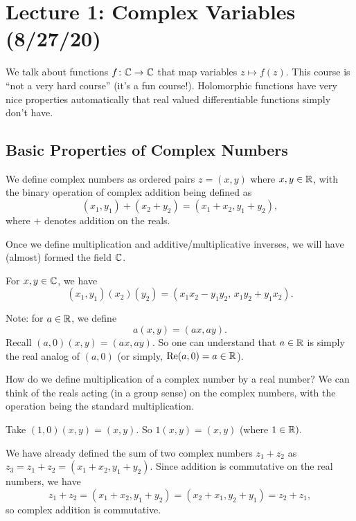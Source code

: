 \section{Lecture 1: Complex Variables (8/27/20)}
We talk about functions $ f \colon \mathbb{C} \to \mathbb{C}$ that map variables $z \mapsto f(z)$. This course is ``not a very hard course'' (it's a fun course!). Holomorphic functions have very nice properties automatically that real valued differentiable functions simply don't have.
\subsection{Basic Properties of Complex Numbers}
\begin{definition}
    We define complex numbers as ordered pairs $z=(x,y)$ where $x,y \in \mathbb{R}$, with the binary operation of complex addition being defined as \[
        (x_1,y_1)+(x_2+y_2)=(x_1+x_2,y_1+y_2),
    \]
   where $+$ denotes addition on the reals. 
\end{definition}
Once we define multiplication and additive/multiplicative inverses, we will have (almost) formed the field $\mathbb{C}$. 
\begin{definition}
    For $x,y \in \mathbb{C}$, we have 
    \[
    (x_1,y_1)(x_2)(y_2)=(x_1x_2-y_1y_2,\,x_1y_2+y_1x_2).
    \]
\end{definition}
Note: for $a \in \mathbb{R}$, we define \[
    a(x,y)=(ax,ay).
\]
Recall $(a,0)(x,y)=(ax,ay).$ So one can understand that $a\in\mathbb{R}$ is simply the real analog of $(a,0)$ (or simply, $\operatorname{Re}(a,0)=a \in \mathbb{R}$).

How do we define multiplication of a complex number by a real number? We can think of the reals acting (in a group sense) on the complex numbers, with the operation being the standard multiplication.

\begin{example}
    Take $(1,0)(x,y)=(x,y).$ So $1(x,y)=(x,y)$ (where $1 \in \mathbb{R}).$
\end{example}

\begin{example}
    
We have already defined the sum of two complex numbers $z_1+z_2$ as $z_3=z_1+z_2=(x_1+x_2,y_1+y_2).$ Since addition is commutative on the real numbers, we have  \[
  z_1+z_2=(x_1+x_2,y_1+y_2)=(x_2+x_1,y_2+y_1)=z_2+z_1,
\]
so complex addition is commutative.
\end{example}

